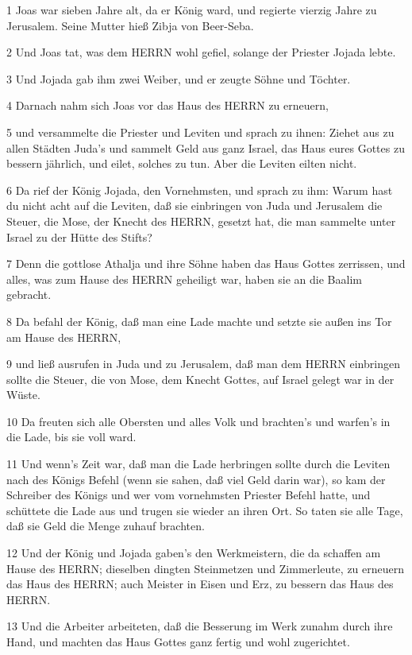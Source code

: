 \par 1 Joas war sieben Jahre alt, da er König ward, und regierte vierzig Jahre zu Jerusalem. Seine Mutter hieß Zibja von Beer-Seba.
\par 2 Und Joas tat, was dem HERRN wohl gefiel, solange der Priester Jojada lebte.
\par 3 Und Jojada gab ihm zwei Weiber, und er zeugte Söhne und Töchter.
\par 4 Darnach nahm sich Joas vor das Haus des HERRN zu erneuern,
\par 5 und versammelte die Priester und Leviten und sprach zu ihnen: Ziehet aus zu allen Städten Juda's und sammelt Geld aus ganz Israel, das Haus eures Gottes zu bessern jährlich, und eilet, solches zu tun. Aber die Leviten eilten nicht.
\par 6 Da rief der König Jojada, den Vornehmsten, und sprach zu ihm: Warum hast du nicht acht auf die Leviten, daß sie einbringen von Juda und Jerusalem die Steuer, die Mose, der Knecht des HERRN, gesetzt hat, die man sammelte unter Israel zu der Hütte des Stifts?
\par 7 Denn die gottlose Athalja und ihre Söhne haben das Haus Gottes zerrissen, und alles, was zum Hause des HERRN geheiligt war, haben sie an die Baalim gebracht.
\par 8 Da befahl der König, daß man eine Lade machte und setzte sie außen ins Tor am Hause des HERRN,
\par 9 und ließ ausrufen in Juda und zu Jerusalem, daß man dem HERRN einbringen sollte die Steuer, die von Mose, dem Knecht Gottes, auf Israel gelegt war in der Wüste.
\par 10 Da freuten sich alle Obersten und alles Volk und brachten's und warfen's in die Lade, bis sie voll ward.
\par 11 Und wenn's Zeit war, daß man die Lade herbringen sollte durch die Leviten nach des Königs Befehl (wenn sie sahen, daß viel Geld darin war), so kam der Schreiber des Königs und wer vom vornehmsten Priester Befehl hatte, und schüttete die Lade aus und trugen sie wieder an ihren Ort. So taten sie alle Tage, daß sie Geld die Menge zuhauf brachten.
\par 12 Und der König und Jojada gaben's den Werkmeistern, die da schaffen am Hause des HERRN; dieselben dingten Steinmetzen und Zimmerleute, zu erneuern das Haus des HERRN; auch Meister in Eisen und Erz, zu bessern das Haus des HERRN.
\par 13 Und die Arbeiter arbeiteten, daß die Besserung im Werk zunahm durch ihre Hand, und machten das Haus Gottes ganz fertig und wohl zugerichtet.
